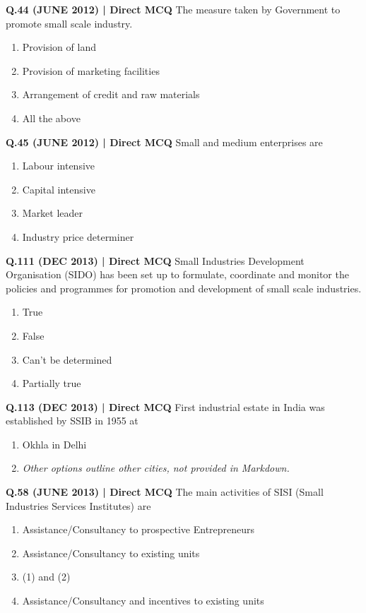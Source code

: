 \documentclass{article}
\begin{document}
\textbf{Q.44 (JUNE 2012) | Direct MCQ}
The measure taken by Government to promote small scale industry.
\begin{enumerate}[label=(\arabic*)]
    \item Provision of land
    \item Provision of marketing facilities
    \item Arrangement of credit and raw materials
    \item All the above
\end{enumerate}

\textbf{Q.45 (JUNE 2012) | Direct MCQ}
Small and medium enterprises are
\begin{enumerate}[label=(\arabic*)]
    \item Labour intensive
    \item Capital intensive
    \item Market leader
    \item Industry price determiner
\end{enumerate}

\textbf{Q.111 (DEC 2013) | Direct MCQ}
Small Industries Development Organisation (SIDO) has been set up to formulate, coordinate and monitor the policies and programmes for promotion and development of small scale industries.
\begin{enumerate}[label=(\arabic*)] %
    \item True
    \item False
    \item Can't be determined
    \item Partially true
\end{enumerate}

\textbf{Q.113 (DEC 2013) | Direct MCQ}
First industrial estate in India was established by SSIB in 1955 at
\begin{enumerate}[label=(\arabic*)]
    \item Okhla in Delhi
    \item \emph{Other options outline other cities, not provided in Markdown.}
\end{enumerate}

\textbf{Q.58 (JUNE 2013) | Direct MCQ}
The main activities of SISI (Small Industries Services Institutes) are
\begin{enumerate}[label=(\arabic*)]
    \item Assistance/Consultancy to prospective Entrepreneurs
    \item Assistance/Consultancy to existing units
    \item (1) and (2)
    \item Assistance/Consultancy and incentives to existing units
\end{enumerate}
\end{document}
